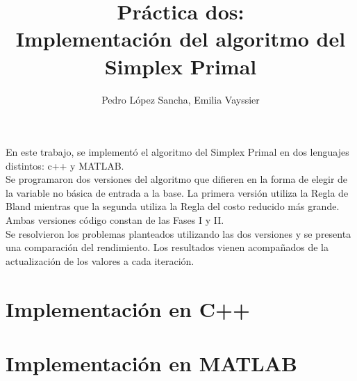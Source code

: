 \documentclass[12pt, titlepage]{article}
\title{Práctica dos: \\ 
\large Implementación del algoritmo del Simplex Primal }
\author{Pedro López Sancha, Emilia Vayssier}
\begin{document}
\maketitle

En este trabajo, se implementó el algoritmo del Simplex Primal en dos lenguajes distintos: c++ y MATLAB. \\
Se programaron dos versiones del algoritmo que difieren en la forma de elegir de la variable no básica de entrada a la base. La primera versión utiliza la Regla de Bland mientras que la segunda utiliza la Regla del costo reducido más grande. Ambas versiones código constan de las Fases I y II. \\
Se resolvieron los problemas planteados utilizando las dos versiones y se presenta una comparación del rendimiento. Los resultados vienen acompañados de la actualización de los valores a cada iteración.

\section{Implementación en C++}

\section{Implementación en MATLAB}
	
\end{document}
